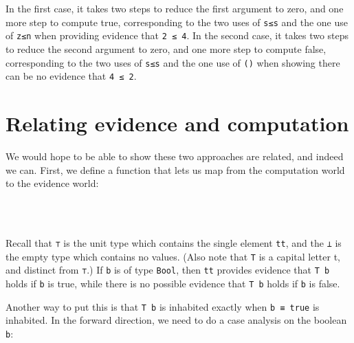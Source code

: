 In the first case, it takes two steps to reduce the first argument to
zero, and one more step to compute true, corresponding to the two uses
of \texttt{s≤s} and the one use of \texttt{z≤n} when providing evidence
that \texttt{2\ ≤\ 4}. In the second case, it takes two steps to reduce
the second argument to zero, and one more step to compute false,
corresponding to the two uses of \texttt{s≤s} and the one use of
\texttt{()} when showing there can be no evidence that \texttt{4\ ≤\ 2}.

\hypertarget{relating-evidence-and-computation}{%
\section{Relating evidence and
computation}\label{relating-evidence-and-computation}}

We would hope to be able to show these two approaches are related, and
indeed we can. First, we define a function that lets us map from the
computation world to the evidence world:

\begin{fence}
\begin{code}%
\>[0]\AgdaSpace{}%
\AgdaSymbol{:}\AgdaSpace{}%
\AgdaSpace{}%
\AgdaSpace{}%
\<%
\\
\>[0]\AgdaSpace{}%
%
\>[9]\AgdaSymbol{=}%
\>[12]\<%
\\
\>[0]\AgdaSpace{}%
%
\>[9]\AgdaSymbol{=}%
\>[12]\<%
\end{code}
\end{fence}

Recall that \texttt{⊤} is the unit type which contains the single
element \texttt{tt}, and the \texttt{⊥} is the empty type which contains
no values. (Also note that \texttt{T} is a capital letter t, and
distinct from \texttt{⊤}.) If \texttt{b} is of type \texttt{Bool}, then
\texttt{tt} provides evidence that \texttt{T\ b} holds if \texttt{b} is
true, while there is no possible evidence that \texttt{T\ b} holds if
\texttt{b} is false.

Another way to put this is that \texttt{T\ b} is inhabited exactly when
\texttt{b\ ≡\ true} is inhabited. In the forward direction, we need to
do a case analysis on the boolean \texttt{b}:

